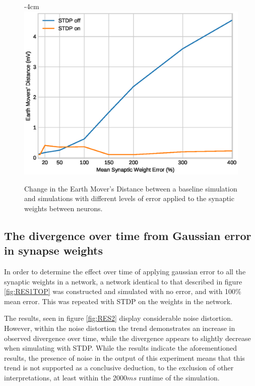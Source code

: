 \begin{figure}[h!]
    \centering
    \addtolength{\leftskip} {-4cm}
    \addtolength{\rightskip}{-4cm}
    \includegraphics[width=0.7\linewidth]{figures/graphs/RESULT1.eps}
    \caption[Increase in EMD from inserting error in network synaptic weights]{Change in the Earth Mover's Distance between a baseline simulation and simulations with different levels of error applied to the synaptic weights between neurons.}
    \label{fig:RES1}
\end{figure}
\FloatBarrier


\subsection{The divergence over time from Gaussian error in synapse weights}

In order to determine the effect over time of applying gaussian error to all the
synaptic weights in a network, a network identical to that described in figure
\ref{fig:RES1TOP} was constructed and simulated with no error, and with 100\%
mean error. This was repeated with STDP on the weights in the network. 

The results, seen in figure \ref{fig:RES2} display considerable noise
distortion. However, within the noise distortion the trend demonstrates an
increase in observed divergence over time, while the divergence appears to
slightly decrease when simulating with STDP. While the results indicate the
aforementioned results, the presence of noise in the output of this experiment
means that this trend is not supported as a conclusive deduction, to the
exclusion of other interpretations, at least within the $2000ms$ runtime of the
simulation.

